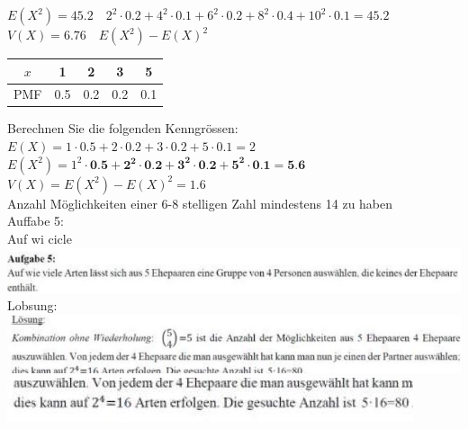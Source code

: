 \documentclass[10pt]{article}
\begin{document}
$E\left(X^{2}\right)=45.2 \quad 2^{2} \cdot 0.2+4^{2} \cdot 0.1+6^{2} \cdot 0.2+8^{2} \cdot 0.4+10^{2} \cdot 0.1=45.2$\\
$V(X)=6.76 \quad E\left(X^{2}\right)-E(X)^{2}$

\begin{center}
\begin{tabular}{|c|c|c|c|c|}
\hline
$x$ & 1 & 2 & 3 & 5 \\
\hline
PMF & 0.5 & 0.2 & 0.2 & 0.1 \\
\hline
\end{tabular}
\end{center}

Berechnen Sie die folgenden Kenngrössen:\\
$E(X)=1 \cdot 0.5+2 \cdot 0.2+3 \cdot 0.2+5 \cdot 0.1=2$\\
$E\left(X^{2}\right)=1^{2} \cdot \mathbf{0 . 5 + 2 ^ { 2 } \cdot 0 . 2 + \mathbf { 3 } ^ { 2 } \cdot 0 . 2 + \mathbf { 5 } ^ { 2 } \cdot 0 . 1 = 5 . 6}$\\
$V(X)=E\left(X^{2}\right)-E(X)^{2}=1.6$\\
Anzahl Möglichkeiten einer 6-8 stelligen Zahl mindestens 14 zu haben\\
Auffabe 5:\\
Auf wi cicle\\
\includegraphics[width=\linewidth]{images/2024_12_29_0906b02acf849bda8665g-3(4)}\\
Lobsung:\\
\includegraphics[width=\linewidth]{images/2024_12_29_0906b02acf849bda8665g-3(10)}\\
\includegraphics[width=\linewidth]{images/2024_12_29_0906b02acf849bda8665g-3(5)}
\end{document}
